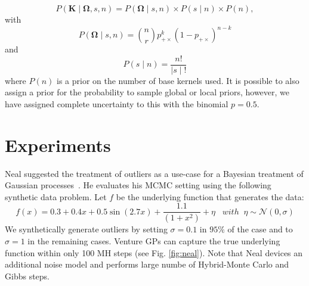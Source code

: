\documentclass{article} %
\begin{document}
\begin{equation}
P(\mathbf{K} \mid \bm{\Omega},s,n) = P(\bm{\Omega} \mid s,n)\times P(s \mid n) \times P(n),
\end{equation}
with
\begin{equation}
P(\bm{\Omega} \mid s,n)= {n \choose r}  p_{+\times}^k (1 - p_{+\times})^{n-k}
\end{equation}
and
\begin{equation}
P(s \mid n) = \frac{n!}{ \mid s \mid !}
\end{equation}
where $P(n)$ is a prior on the number of base kernels used. It is possible to also assign a prior for the probability to sample global or local priors, however, we have assigned complete uncertainty to this with the binomial $p = 0.5$.

\section{Experiments}

Neal suggested the treatment of outliers as a use-case for a Bayesian treatment of Gaussian processes~\citeyearpar{neal1997monte}. He evaluates his MCMC setting using the following synthetic data problem. Let $f$ be the underlying function that generates the data:
\begin{equation}
f(x) =  0.3 + 0.4 x + 0.5 \sin(2.7x) + \frac{1.1}{(1+ x^2)} + \eta \;\;\; with\;\;\eta \sim \mathcal{N}(0,\sigma)
\end{equation}
We synthetically generate outliers by setting $\sigma = 0.1$ in $95\%$ of the case and to $\sigma = 1$ in the remaining cases. Venture GPs can capture the true underlying function within only 100 MH steps (see Fig. \ref{fig:neal}). Note that Neal devices an additional noise model and performs large numbe of Hybrid-Monte Carlo and Gibbs steps.  
\end{document}
